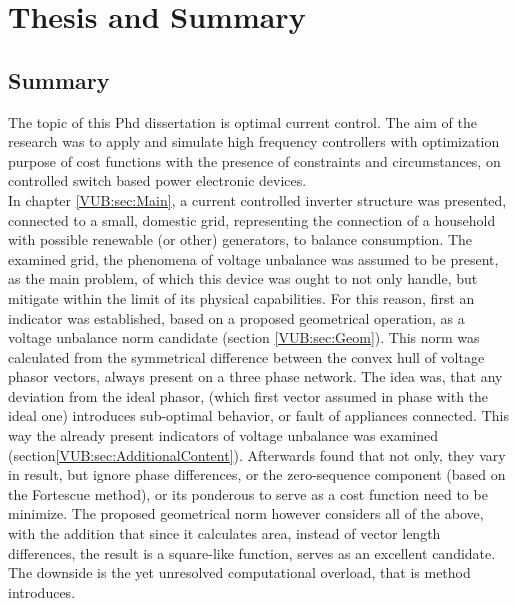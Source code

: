 \chapter{Thesis and Summary}

\section{Summary}

The topic of this Phd dissertation is optimal current control. The aim of the research was to apply and simulate high frequency controllers with optimization purpose of cost functions with the presence of constraints and circumstances, on controlled switch based power electronic devices.\\
In chapter \ref{VUB:sec:Main}, a current controlled inverter structure was presented, connected to a small, domestic grid, representing the connection of a household with possible renewable (or other) generators, to balance consumption. The examined grid, the phenomena of voltage unbalance was assumed to be present, as the main problem, of which this device was ought to not only handle, but mitigate within the limit of its physical capabilities. For this reason, first an indicator was established, based on a proposed geometrical operation, as a voltage unbalance norm candidate (section \ref{VUB:sec:Geom}). This norm was calculated from the symmetrical difference between the convex hull of voltage phasor vectors, always present on a three phase network. The idea was, that any deviation from the ideal phasor, (which first vector assumed in phase with the ideal one) introduces sub-optimal behavior, or fault of appliances connected. This way the already present indicators of voltage unbalance was examined (section\ref{VUB:sec:AdditionalContent}). Afterwards found that not only, they vary in result, but ignore phase differences, or the zero-sequence component (based on the Fortescue method), or its ponderous to serve as a cost function need to be minimize. The proposed geometrical norm however considers all of the above, with the addition that since it calculates area, instead of vector length differences, the result is a square-like function, serves as an excellent candidate. The downside is the yet unresolved computational overload, that is method introduces.\\
